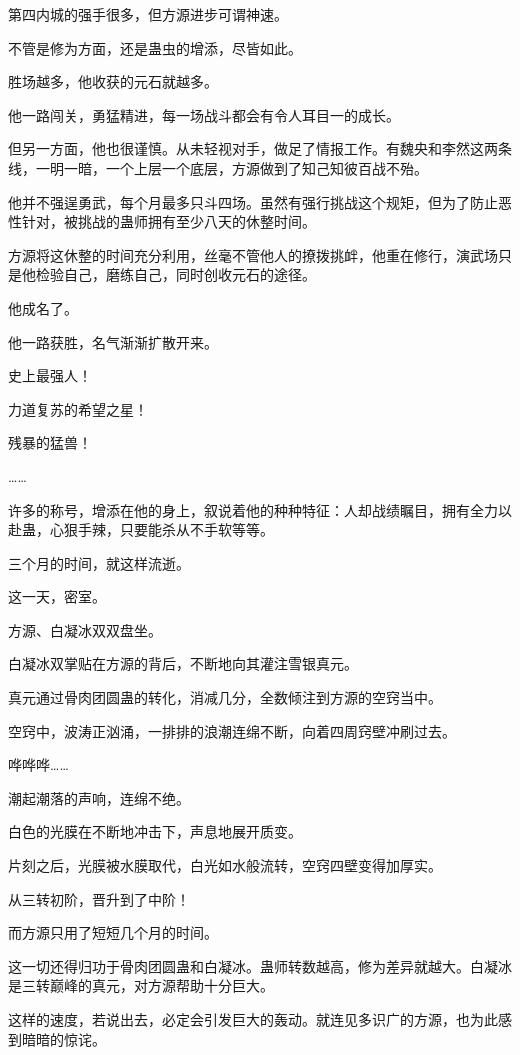 \begin{this_body}
第四内城的强手很多，但方源进步可谓神速。

不管是修为方面，还是蛊虫的增添，尽皆如此。

胜场越多，他收获的元石就越多。

他一路闯关，勇猛精进，每一场战斗都会有令人耳目一的成长。

但另一方面，他也很谨慎。从未轻视对手，做足了情报工作。有魏央和李然这两条线，一明一暗，一个上层一个底层，方源做到了知己知彼百战不殆。

他并不强逞勇武，每个月最多只斗四场。虽然有强行挑战这个规矩，但为了防止恶性针对，被挑战的蛊师拥有至少八天的休整时间。

方源将这休整的时间充分利用，丝毫不管他人的撩拨挑衅，他重在修行，演武场只是他检验自己，磨练自己，同时创收元石的途径。

他成名了。

他一路获胜，名气渐渐扩散开来。

史上最强人！

力道复苏的希望之星！

残暴的猛兽！

……

许多的称号，增添在他的身上，叙说着他的种种特征：人却战绩瞩目，拥有全力以赴蛊，心狠手辣，只要能杀从不手软等等。

三个月的时间，就这样流逝。

这一天，密室。

方源、白凝冰双双盘坐。

白凝冰双掌贴在方源的背后，不断地向其灌注雪银真元。

真元通过骨肉团圆蛊的转化，消减几分，全数倾注到方源的空窍当中。

空窍中，波涛正汹涌，一排排的浪潮连绵不断，向着四周窍壁冲刷过去。

哗哗哗……

潮起潮落的声响，连绵不绝。

白色的光膜在不断地冲击下，声息地展开质变。

片刻之后，光膜被水膜取代，白光如水般流转，空窍四壁变得加厚实。

从三转初阶，晋升到了中阶！

而方源只用了短短几个月的时间。

这一切还得归功于骨肉团圆蛊和白凝冰。蛊师转数越高，修为差异就越大。白凝冰是三转巅峰的真元，对方源帮助十分巨大。

这样的速度，若说出去，必定会引发巨大的轰动。就连见多识广的方源，也为此感到暗暗的惊诧。


\end{this_body}

